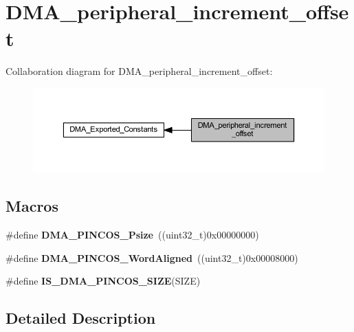 \hypertarget{group___d_m_a__peripheral__increment__offset}{}\section{D\+M\+A\+\_\+peripheral\+\_\+increment\+\_\+offset}
\label{group___d_m_a__peripheral__increment__offset}
Collaboration diagram for D\+M\+A\+\_\+peripheral\+\_\+increment\+\_\+offset\+:\nopagebreak
\begin{figure}[H]
\begin{center}
\leavevmode
\includegraphics[width=350pt]{group___d_m_a__peripheral__increment__offset}
\end{center}
\end{figure}
\subsection*{Macros}
\begin{DoxyCompactItemize}
\item 
\mbox{\label{group___d_m_a__peripheral__increment__offset_ga939053c42e486b82963b8eecc809bce0}} 
\#define {\bfseries D\+M\+A\+\_\+\+P\+I\+N\+C\+O\+S\+\_\+\+Psize}~((uint32\+\_\+t)0x00000000)
\item 
\mbox{\label{group___d_m_a__peripheral__increment__offset_gaae8184971db13b62cd9f4dc5aecf9c22}} 
\#define {\bfseries D\+M\+A\+\_\+\+P\+I\+N\+C\+O\+S\+\_\+\+Word\+Aligned}~((uint32\+\_\+t)0x00008000)
\item 
\#define {\bfseries I\+S\+\_\+\+D\+M\+A\+\_\+\+P\+I\+N\+C\+O\+S\+\_\+\+S\+I\+ZE}(S\+I\+ZE)
\end{DoxyCompactItemize}


\subsection{Detailed Description}


